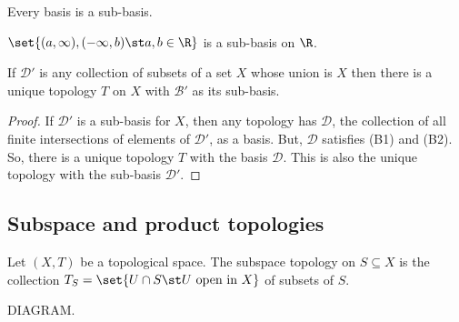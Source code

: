 \begin{nprop}
  Every basis is a sub-basis.
\end{nprop}

\begin{negg}
  $\set{(a,\infty), (-\infty,b) \st a,b \in \R}$ is a sub-basis on $\R$.\eggqed
\end{negg}

\begin{nprop}
  If $\mathcal{D}'$ is any collection of subsets of a set $X$ whose union is $X$ then there is a unique topology $T$ on $X$ with $\mathcal{B}'$ as its sub-basis.
\end{nprop}
\begin{proof}
  If $\mathcal{D}'$ is a sub-basis for $X$, then any topology has $\mathcal{D}$, the collection of all finite intersections of elements of $\mathcal{D}'$, as a basis. But, $\mathcal{D}$ satisfies (B1) and (B2). So, there is a unique topology $T$ with the basis $\mathcal{D}$. This is also the unique topology with the sub-basis $\mathcal{D}'$.
\end{proof}

\subsection{Subspace and product topologies}
\begin{ndfn}
  Let $(X,T)$ be a topological space. The subspace topology on $S \subseteq X$ is the collection $T_S = \set{U \cap S \st U \text{ open in } X}$ of subsets of $S$.
\end{ndfn}

DIAGRAM.

